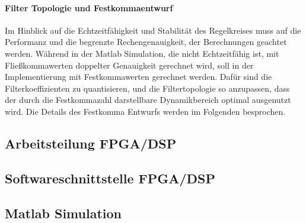 \paragraph{Filter Topologie und Festkommaentwurf}
Im Hinblick auf die Echtzeitfähigkeit und Stabilität des Regelkreises muss auf die Performanz und die begrenzte Rechengenauigkeit, der Berechnungen geachtet werden. Während in der Matlab Simulation, die nicht Echtzeitfähig ist, mit Fließkommawerten doppelter Genauigkeit gerechnet wird, soll in der Implementierung mit Festkommawerten gerechnet werden.
Dafür sind die Filterkoeffizienten zu quantisieren, und die Filtertopologie so anzupassen, dass der durch die Festkommazahl darstellbare Dynamikbereich optimal ausgenutzt wird. Die Details des Festkomma Entwurfs werden im Folgenden besprochen.


\subsection{Arbeitsteilung FPGA/DSP}

\subsection{Softwareschnittstelle FPGA/DSP}

\subsection{Matlab Simulation}

